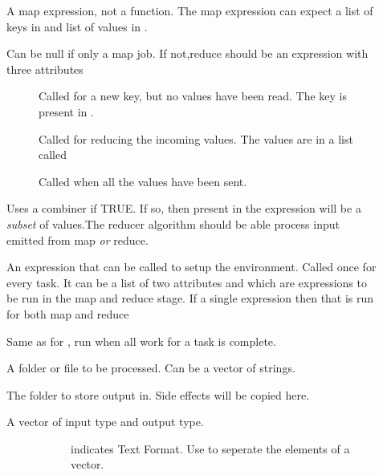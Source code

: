 \documentclass[letterpaper,10pt,english]{manual}
\begin{document}
\begin{description}
\item[]
A map expression, not a function. The map expression can expect a list of keys in  and list of values in .

\item[]
Can be null if only a map job. If not,reduce should be an expression with three attributes
\begin{description}
\item[]
Called for a new key, but no values have been read. The key is present in .

\item[]
Called for reducing the incoming values. The values are in a list called 

\item[]
Called when all the values have been sent.

\end{description}

\item[]
Uses a combiner if TRUE. If so, then  present in the  expression will be a \emph{subset} of values.The reducer algorithm should be able process input emitted from map \emph{or} reduce.

\item[]
An expression that can be called to setup the environment. Called once for every task.
It can be a list of two attributes  and  which are expressions to be run in the map and reduce stage. If a single expression then that is run for both map and reduce

\item[]
Same as for , run when all work for a task is complete.

\item[]
A folder or file to be processed. Can be a vector of strings.

\item[]
The folder to store output in. Side effects will be copied here.

\item[]\begin{description}
\item[A vector of input type and output type.]\begin{description}
\item[]
indicates Text Format. Use  to seperate the elements of a vector.


\end{description}
\end{description}
\end{description}
\end{document}
